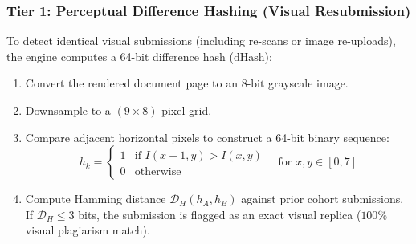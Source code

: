 \documentclass[journal]{IEEEtran}
\begin{document}
\subsubsection{Tier 1: Perceptual Difference Hashing (Visual Resubmission)}
To detect identical visual submissions (including re-scans or image re-uploads), the engine computes a 64-bit difference hash ($\text{dHash}$):
\begin{enumerate}
    \item Convert the rendered document page to an $8\text{-bit}$ grayscale image.
    \item Downsample to a $(9 \times 8)$ pixel grid.
    \item Compare adjacent horizontal pixels to construct a 64-bit binary sequence:
    \begin{equation}
        h_k = \begin{cases} 1 & \text{if } I(x+1, y) > I(x, y) \\ 0 & \text{otherwise} \end{cases} \quad \text{for } x, y \in [0, 7]
    \end{equation}
    \item Compute Hamming distance $\mathcal{D}_H(h_A, h_B)$ against prior cohort submissions. If $\mathcal{D}_H \le 3$ bits, the submission is flagged as an exact visual replica ($100\%$ visual plagiarism match).
\end{enumerate}
\end{document}
